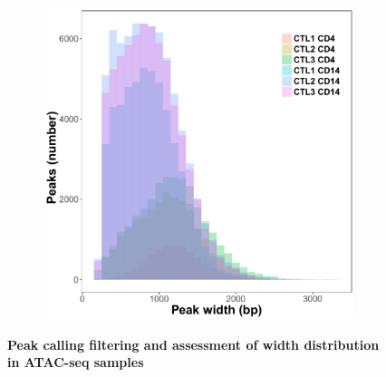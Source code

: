 \begin{figure}[htbp]
\begin{subfigure}{0.5\textwidth}
\includegraphics[width=\textwidth]{./Results1/pdfs/peak_width_hist_CD4_CD14_PVAL_IDR_filtered_peaks}
\caption{\textbf{}} %
\end{subfigure}%
\caption[Peak calling assessment and IDR filtering in ATAC-seq samples]{\textbf{Peak calling filtering and assessment of width distribution in ATAC-seq samples} \\
}
\label{fig:Peak_calling_IDR_filtering_and_width_ATAC}
\end{figure} 